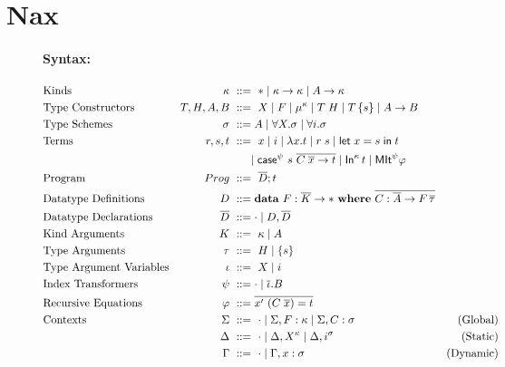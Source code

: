 \section{Nax}\label{sec:nax}
\begin{figure}
\begin{framed}
\paragraph{Syntax:}
\begin{align*}
&\text{Kinds}
	& \kappa	&~ ::= ~ * \mid \kappa -> \kappa \mid A -> \kappa
 \\
&\text{Type Constructors}
	& T,H,A,B	&~ ::= ~ X \mid F
			   \mid \mu^\kappa
			   \mid T\;H \mid T\,\{s\}
			   \mid A -> B
 \\
&\text{Type Schemes}
	& \sigma	&~ ::= A
			   \mid \forall X.\sigma
			   \mid \forall i.\sigma
 \\
&\text{Terms}
	& r,s,t		&~ ::= ~ x \mid i
			   \mid \lambda x.t \mid r\;s \mid \mathsf{let}\;x = s\;\mathsf{in}\; t \\
&	&		&~~~~~
			   \mid \mathsf{case}^\psi~s~\overline{C\;\overline{x} -> t}
			   \mid \mathsf{In}^\kappa\,t
			   \mid \mathsf{MIt}^\psi \varphi 
 \\
&\text{Program}
	& Prog		&~ ::= ~ \overline{D};t
 \\
&\text{Datatype Definitions}
	& D		&~ ::= \mathbf{data}~ F : \overline{K} -> *
                             ~ \mathbf{where} ~
                               \overline{C : \overline{A} -> F\,\overline{\tau}}
 \\
&\text{Datatype Declarations}
	& \overline{D}	&~ ::= \cdot \mid D,\overline{D}
 \\
&\text{Kind Arguments}
	& K		&~ ::= ~ \kappa \mid A
 \\
&\text{Type Arguments}
	& \tau		&~ ::= ~ H \mid \{s\}
 \\
&\text{Type Argument Variables}
	& \iota		&~ ::= ~ X \mid i
 \\
&\text{Index Transformers}
	& \psi		&~ ::= \cdot \mid \overline\iota . B
 \\
&\text{Recursive Equations}
	& \varphi	&~ ::= \overline{x' ~ (C\;\overline{x}) = t}
 \\
&\text{Contexts}
	& \Sigma	&~ ::= ~ \cdot
			   \mid \Sigma, F: \kappa \mid \Sigma, C: \sigma
	& \text{(Global)}
 \\
&	& \Delta	&~ ::= ~ \cdot
			   \mid \Delta, X^\kappa
			   \mid \Delta, i^\sigma
	& \text{(Static)}
 \\
&	& \Gamma	&~ ::= ~ \cdot \mid \Gamma,x:\sigma
	& \text{(Dynamic)}
\end{align*}


\end{framed}
\end{figure}
